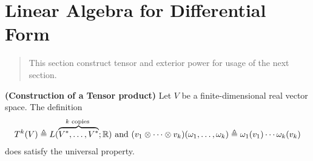 \documentclass{report}
\begin{document}
\section{Linear Algebra for Differential Form}
\begin{abstract}
This section construct tensor and exterior power for usage of the next section. 
\end{abstract}
\begin{theorem}
\label{CoT}
\textbf{(Construction of a Tensor product)} Let $V$ be a finite-dimensional real vector space. The definition 
 \begin{align*}
   T^k(V)\triangleq L(\overbrace{V^*,\dots ,V^*}^{k\text{ copies }};\mathbb{R})\text{ and }(v_1\otimes \cdots \otimes  v_k)(\omega_1 ,\dots , \omega_k)\triangleq \omega_1(v_1)\cdots \omega_k (v_k)
\end{align*}
does satisfy the universal property.
\end{theorem}
\end{document}
